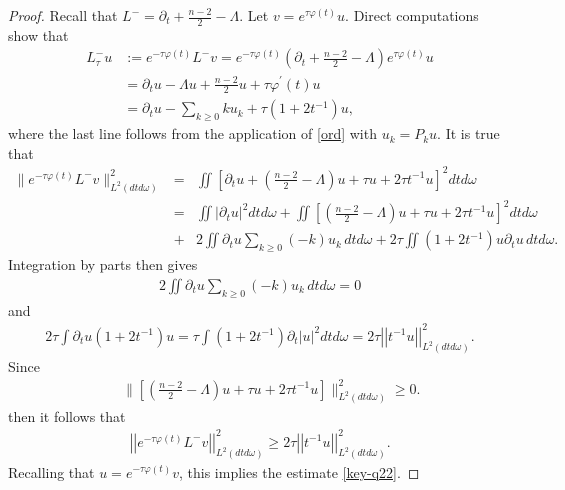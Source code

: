 \documentclass[11pt]{amsart}
\theoremstyle{plain}
\numberwithin{equation}{section}
\begin{document}
\begin{proof}
Recall that $L^-=\partial_t+\frac{n-2}{2}-\Lambda$.
Let $v=e^{\tau\varphi(t)}u$.
Direct computations show that
\begin{align*}
L^-_{\tau} u &:= e^{- \tau {\varphi}{\left( {t} \right) }} L^- v
= e^{- \tau {\varphi}{\left( {t} \right) }} {\left( {\partial_t+\frac{n-2}{2}-\Lambda} \right) } e^{\tau\varphi(t)}u \nonumber \\
&= \partial_t u -\Lambda u +  \frac{n-2}{2} u
+ \tau {\varphi}^\prime{\left( {t} \right) } u \nonumber \\
&=  \partial_t u -\sum_{k \ge 0} k u_k + \tau {\left( {1 + 2 t^{-1}} \right) } u,
\end{align*}
where the last line follows from the application of \eqref{ord} with
$u_k = P_k u$.
It is true that
\begin{eqnarray*}
\|e^{-\tau\varphi(t)}L^-v\|^2_{L^2(dtd\omega)} &=&
\iint {\left[{\partial_t u+{\left( {\frac{n-2}{2}-\Lambda} \right) } u+\tau u+2\tau t^{-1} u  }\right]}^2 dtd\omega \nonumber \\
&=& \iint  {\left\vert{\partial_t u}\right\vert}^2 dtd{\omega}
+  \iint {\left[{{\left( {\frac{n-2}{2}-\Lambda} \right) } u+\tau u+2\tau t^{-1} u }\right]}^2
dtd{\omega}  \\
&+&  2 \iint  { \partial}_t u \sum_{k
\ge 0} (-k) u_k \, dt d{\omega}
+  2 \tau \iint   {\left( {1 + 2 t^{-1}} \right) }
u { \partial}_t u \, dt d{\omega} .
\end{eqnarray*}
Integration by parts then gives
\begin{eqnarray*}
2 \iint  { \partial}_t u \sum_{k \ge 0} {\left( {-k} \right) } u_k \, dt d{\omega} =0
\end{eqnarray*}
and
\begin{eqnarray*}
 2 \tau \int  { \partial}_t u {\left( {1 + 2 t^{-1}} \right) } u
= \tau \int  {\left( {1 + 2 t^{-1}} \right) } { \partial}_t{\left\vert{u}\right\vert}^2 dt d{\omega} 
= 2 \tau {\left\vert\left\vert { t^{-1}u}\right\vert\right\vert}^2_{L^2{\left( {dt d{\omega}} \right) }}.
\end{eqnarray*}
Since
\begin{eqnarray*}
&&\|{\left[{{\left( {\frac{n-2}{2}-\Lambda} \right) } u+\tau u+2\tau t^{-1} u
}\right]}\|^2_{L^2(dtd\omega)}
\geq 0.
\end{eqnarray*}
then it follows that
\begin{align*}
{\left\vert\left\vert { e^{-\tau\varphi(t)}L^-v}\right\vert\right\vert}^2_{L^2(dtd\omega)} \ge 2 \tau {\left\vert\left\vert {t^{-1}u}\right\vert\right\vert}^2_{L^2(dtd\omega)} .
\end{align*}
Recalling that $u = e^{- \tau {\varphi}{\left( {t} \right) }} v$,
 this implies the estimate \eqref{key-q22}.
\end{proof}
\end{document}
